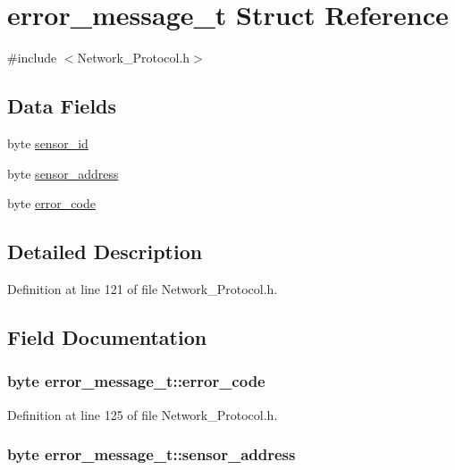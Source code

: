 \hypertarget{structerror__message__t}{\section{error\-\_\-message\-\_\-t Struct Reference}
\label{structerror__message__t}
}


{\ttfamily \#include $<$Network\-\_\-\-Protocol.\-h$>$}

\subsection*{Data Fields}
\begin{DoxyCompactItemize}
\item 
byte \hyperlink{structerror__message__t_a7d9b99908db548242343009da13dc60f}{sensor\-\_\-id}
\item 
byte \hyperlink{structerror__message__t_ac9a2b2d20d6958d26d40d925c38736d9}{sensor\-\_\-address}
\item 
byte \hyperlink{structerror__message__t_a9a48d96d403bcbcd5d0540a1c821619b}{error\-\_\-code}
\end{DoxyCompactItemize}


\subsection{Detailed Description}


Definition at line 121 of file Network\-\_\-\-Protocol.\-h.



\subsection{Field Documentation}
\hypertarget{structerror__message__t_a9a48d96d403bcbcd5d0540a1c821619b}{
\subsubsection[{error\-\_\-code}]{\setlength{\rightskip}{0pt plus 5cm}byte error\-\_\-message\-\_\-t\-::error\-\_\-code}}\label{structerror__message__t_a9a48d96d403bcbcd5d0540a1c821619b}


Definition at line 125 of file Network\-\_\-\-Protocol.\-h.

\hypertarget{structerror__message__t_ac9a2b2d20d6958d26d40d925c38736d9}{
\subsubsection[{sensor\-\_\-address}]{\setlength{\rightskip}{0pt plus 5cm}byte error\-\_\-message\-\_\-t\-::sensor\-\_\-address}}\label{structerror__message__t_ac9a2b2d20d6958d26d40d925c38736d9}


